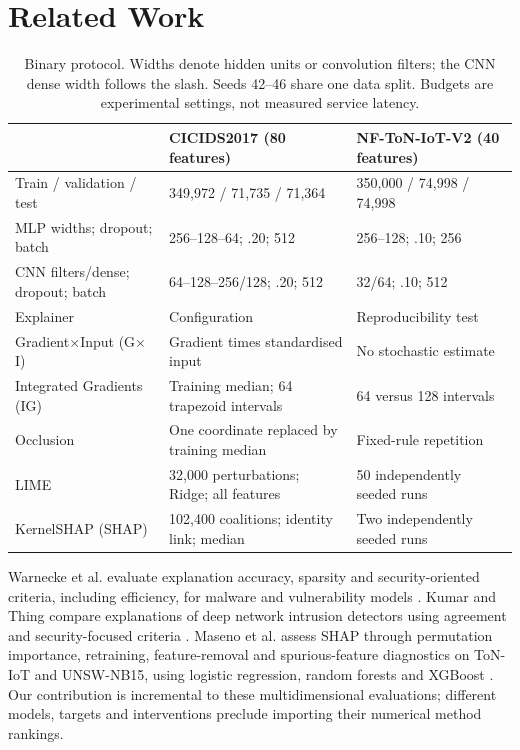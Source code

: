 \section{Related Work}

\begin{table}[t]
\centering\small
\caption{Binary protocol. Widths denote hidden units or convolution filters;
the CNN dense width follows the slash. Seeds 42--46 share one data split.
Budgets are experimental settings, not measured service latency.}
\label{tab:protocol}
\setlength{\tabcolsep}{5pt}
\begin{tabular}{lll}
\toprule
 & CICIDS2017 (80 features) & NF-ToN-IoT-V2 (40 features) \\
\midrule
Train / validation / test & 349,972 / 71,735 / 71,364 & 350,000 / 74,998 / 74,998 \\
MLP widths; dropout; batch & 256--128--64; .20; 512 & 256--128; .10; 256 \\
CNN filters/dense; dropout; batch & 64--128--256/128; .20; 512 & 32/64; .10; 512 \\
\midrule
Explainer & Configuration & Reproducibility test \\
Gradient$\times$Input (G$\times$I) & Gradient times standardised input & No stochastic estimate \\
Integrated Gradients (IG) & Training median; 64 trapezoid intervals & 64 versus 128 intervals \\
Occlusion & One coordinate replaced by training median & Fixed-rule repetition \\
LIME & 32,000 perturbations; Ridge; all features & 50 independently seeded runs \\
KernelSHAP (SHAP) & 102,400 coalitions; identity link; median & Two independently seeded runs \\
\bottomrule
\end{tabular}
\end{table}

Warnecke et al. evaluate explanation accuracy, sparsity and security-oriented
criteria, including efficiency, for malware and vulnerability models
\cite{warnecke2020evaluating}. Kumar and Thing compare explanations of deep
network intrusion detectors using agreement and security-focused criteria
\cite{kumar2024evaluating}. Maseno et al. assess SHAP through permutation
importance, retraining, feature-removal and spurious-feature diagnostics on
ToN-IoT and UNSW-NB15, using logistic regression, random forests and XGBoost
\cite{maseno2026reliability}. Our contribution is incremental to these
multidimensional evaluations; different models, targets and interventions
preclude importing their numerical method rankings.

